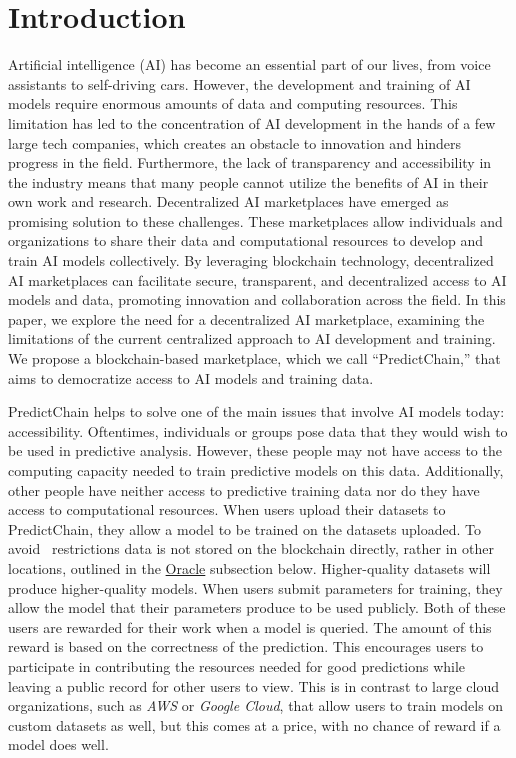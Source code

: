 \documentclass{ledger}
\begin{document}
\section{Introduction}

Artificial intelligence (AI) has become an essential part of our lives, from voice assistants to self-driving cars.
However, the development and training of AI models require enormous amounts of data and computing resources. This
limitation has led to the concentration of AI development in the hands of a few large tech companies, which creates an
obstacle to innovation and hinders progress in the field. Furthermore, the lack of transparency and accessibility in the
industry means that many people cannot utilize the benefits of AI in their own work and research.
Decentralized AI marketplaces have emerged as promising solution to these challenges. These marketplaces allow individuals
and organizations to share their data and computational resources to develop and train AI models collectively. By leveraging
blockchain technology, decentralized AI marketplaces can facilitate secure, transparent, and decentralized access to AI
models and data, promoting innovation and collaboration across the field.
In this paper, we explore the need for a decentralized AI marketplace, examining the limitations of the current
centralized approach to AI development and training. We propose a blockchain-based marketplace, which we call
``PredictChain,'' that aims to democratize access to AI models and training data.

PredictChain helps to solve one of the main issues that involve AI models today: accessibility.
Oftentimes, individuals or groups pose data that they would wish to be used in predictive analysis.
However, these people may not have access to the computing capacity needed to train predictive models on this data.
Additionally, other people have neither access to predictive training data nor do they have access to computational resources.
When users upload their datasets to PredictChain, they allow a model to be trained on the datasets uploaded.  To avoid \
restrictions data is not stored on the blockchain directly, rather in other locations, outlined in the
\hyperref[subsec:oracle]{Oracle} subsection below. Higher-quality datasets will produce higher-quality models.
When users submit parameters for training, they allow the model that their parameters produce to be used publicly.
Both of these users are rewarded for their work when a model is queried.  The amount of this reward is based on the
correctness of the prediction.  This encourages users to participate in contributing the resources needed for good
predictions while leaving a public record for other users to view.  This is in contrast to large cloud organizations,
such as \textit{AWS} or \textit{Google Cloud}, that allow users to train models on custom datasets as well, but this
comes at a price, with no chance of reward if a model does well.
\end{document}

